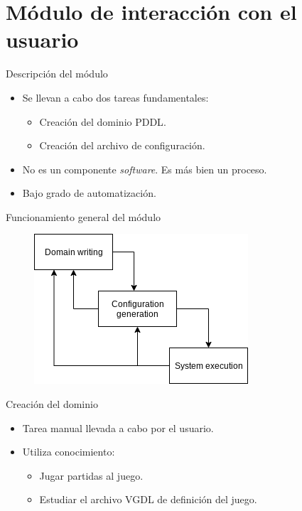 \documentclass[11pt]{beamer}    %
\begin{document}
    \section{Módulo de interacción con el usuario}

    \begin{frame}{Descripción del módulo}
        \begin{itemize}
            \item Se llevan a cabo dos tareas fundamentales:
                \begin{itemize}
                    \item Creación del \alert{dominio PDDL}.
                    \item Creación del \alert{archivo de configuración}.
                \end{itemize}
            \item No es un componente \textit{software}. Es más bien un \alert{proceso}.
            \item Bajo grado de automatización.
        \end{itemize}
    \end{frame}

    \begin{frame}{Funcionamiento general del módulo}
        \begin{figure}
            \centering
            \includegraphics[scale=0.5]{img/presentation/cascade_model}
        \end{figure}
    \end{frame}
    
    \begin{frame}{Creación del dominio}
        \begin{itemize}
            \item Tarea manual llevada a cabo por el usuario.
            \item Utiliza conocimiento:
            \begin{itemize}
                \item Jugar partidas al juego.
                \item Estudiar el archivo VGDL de definición del juego.
            \end{itemize}
        \end{itemize}
    \end{frame}
    
\end{document}
